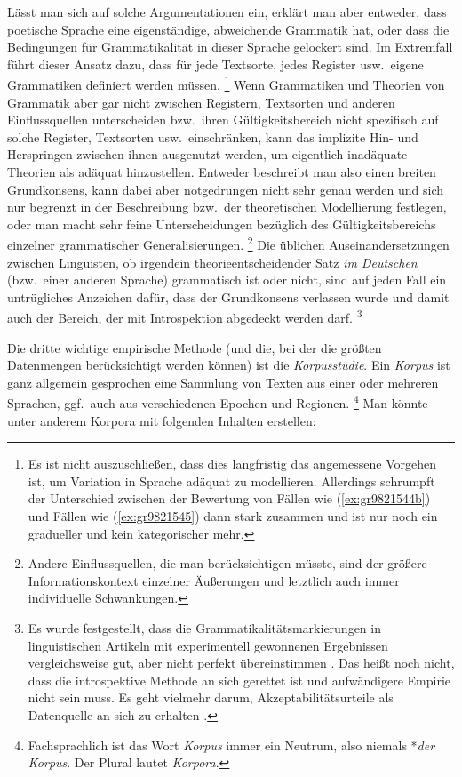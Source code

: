 Lässt man sich auf solche Argumentationen ein, erklärt man aber entweder, dass poetische Sprache eine eigenständige, abweichende Grammatik hat, oder dass die Bedingungen für Grammatikalität in dieser Sprache gelockert sind.
Im Extremfall führt dieser Ansatz dazu, dass für jede Textsorte, jedes Register usw.\ eigene Grammatiken definiert werden müssen.%
\footnote{Es ist nicht auszuschließen, dass dies langfristig das angemessene Vorgehen ist, um Variation in Sprache adäquat zu modellieren.
Allerdings schrumpft der Unterschied zwischen der Bewertung von Fällen wie (\ref{ex:gr9821544b}) und Fällen wie (\ref{ex:gr9821545}) dann stark zusammen und ist nur noch ein gradueller und kein kategorischer mehr.}
Wenn Grammatiken und Theorien von Grammatik aber gar nicht zwischen Registern, Textsorten und anderen Einflussquellen unterscheiden bzw.\ ihren Gültigkeitsbereich nicht spezifisch auf solche Register, Textsorten usw.\ einschränken, kann das implizite Hin- und Herspringen zwischen ihnen ausgenutzt werden, um eigentlich inadäquate Theorien als adäquat hinzustellen.
Entweder beschreibt man also einen breiten Grundkonsens, kann dabei aber notgedrungen nicht sehr genau werden und sich nur begrenzt in der Beschreibung bzw.\ der theoretischen Modellierung festlegen, oder man macht sehr feine Unterscheidungen bezüglich des Gültigkeitsbereichs einzelner grammatischer Generalisierungen.%
\footnote{Andere Einflussquellen, die man berücksichtigen müsste, sind \zB der größere Informationskontext einzelner Äußerungen und letztlich auch immer individuelle Schwankungen.}
Die üblichen Auseinandersetzungen zwischen Linguisten, ob irgendein theorieentscheidender Satz \textit{im Deutschen} (bzw.\ einer anderen Sprache) grammatisch ist oder nicht, sind auf jeden Fall ein untrügliches Anzeichen dafür, dass der Grundkonsens verlassen wurde und damit auch der Bereich, der mit Introspektion abgedeckt werden darf.%
\footnote{Es wurde festgestellt, dass die Grammatikalitätsmarkierungen in linguistischen Artikeln mit experimentell gewonnenen Ergebnissen vergleichsweise gut, aber nicht perfekt übereinstimmen \citep{SprouseEa2013}.
Das heißt noch nicht, dass die introspektive Methode an sich gerettet ist und aufwändigere Empirie nicht sein muss.
Es geht vielmehr darum, Akzeptabilitätsurteile als Datenquelle an sich zu erhalten \citep{SchuetzeSprouse2014}.}

Die dritte wichtige empirische Methode (und die, bei der die größten Datenmengen berücksichtigt werden können) ist die \textit{Korpusstudie}.
Ein \textit{Korpus} ist ganz allgemein gesprochen eine Sammlung von Texten aus einer oder mehreren Sprachen, ggf.\ auch aus verschiedenen Epochen und Regionen.%
\footnote{Fachsprachlich ist das Wort \textit{Korpus} immer ein Neutrum, also niemals *\textit{der Korpus}.
Der Plural lautet \textit{Korpora}.}
Man könnte unter anderem Korpora mit folgenden Inhalten erstellen:

